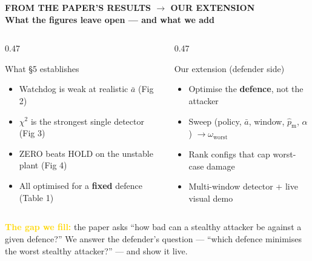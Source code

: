 \documentclass[aspectratio=169,10pt]{beamer}
\begin{document}
{
\begin{frame}[plain]
  \vskip6pt
  {\color{gold}\small\textbf{FROM THE PAPER'S RESULTS $\rightarrow$ OUR EXTENSION}}\\[0.4em]
  {\color{white}\LARGE\textbf{What the figures leave open --- and what we add}}\\[0.8em]
  \begin{columns}[T]
    \begin{column}{0.47\textwidth}
      \begin{block}{What \S5 establishes}
        \begin{itemize}\footnotesize
          \item Watchdog is weak at realistic $\bar a$ (Fig 2)
          \item $\chi^2$ is the strongest single detector (Fig 3)
          \item ZERO beats HOLD on the unstable plant (Fig 4)
          \item All optimised for a \textbf{fixed} defence (Table 1)
        \end{itemize}
      \end{block}
    \end{column}
    \begin{column}{0.47\textwidth}
      \begin{block}{Our extension (defender side)}
        \begin{itemize}\footnotesize
          \item Optimise the \textbf{defence}, not the attacker
          \item Sweep (policy, $\bar a$, window, $\hat p_{\mathrm m}$, $\alpha$) $\to \omega_{\text{worst}}$
          \item Rank configs that cap worst-case damage
          \item Multi-window detector + live visual demo
        \end{itemize}
      \end{block}
    \end{column}
  \end{columns}
  \medskip
  {\color{light}\footnotesize\textbf{\textcolor{gold}{The gap we fill:}} the paper asks ``how bad can a stealthy attacker be against a given defence?'' We answer the defender's question --- ``which defence minimises the worst stealthy attacker?'' --- and show it live.}
\end{frame}}
\end{document}
